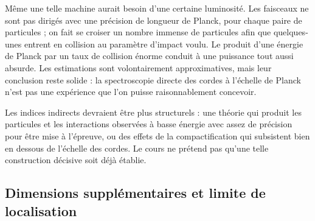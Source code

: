 Même une telle machine aurait besoin d’une certaine luminosité. Les
faisceaux ne sont pas dirigés avec une précision de longueur de Planck,
pour chaque paire de particules ; on fait se croiser un nombre immense de
particules afin que quelques-unes entrent en collision au paramètre
d’impact voulu. Le produit d’une énergie de Planck par un taux de collision
énorme conduit à une puissance tout aussi absurde. Les estimations sont
volontairement approximatives, mais leur conclusion reste solide : la
spectroscopie directe des cordes à l’échelle de Planck n’est pas une
expérience que l’on puisse raisonnablement concevoir.

Les indices indirects devraient être plus structurels : une théorie qui
produit les particules et les interactions observées à basse énergie avec
assez de précision pour être mise à l’épreuve, ou des effets de la
compactification qui subsistent bien en dessous de l’échelle des cordes.
Le cours ne prétend pas qu’une telle construction décisive soit déjà
établie.

\subsection{Dimensions supplémentaires et limite de localisation}

\begin{classroomqa}
\end{classroomqa}

\begin{classroomqa}
\end{classroomqa}

